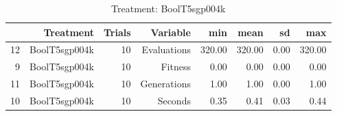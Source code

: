 \begin{table}[ht]
\centering
\begin{tabular}{rrrrrrrr}
  \hline
 & Treatment & Trials & Variable & min & mean & sd & max \\ 
  \hline
12 & BoolT5sgp004k &  10 & Evaluations & 320.00 & 320.00 & 0.00 & 320.00 \\ 
  9 & BoolT5sgp004k &  10 & Fitness & 0.00 & 0.00 & 0.00 & 0.00 \\ 
  11 & BoolT5sgp004k &  10 & Generations & 1.00 & 1.00 & 0.00 & 1.00 \\ 
  10 & BoolT5sgp004k &  10 & Seconds & 0.35 & 0.41 & 0.03 & 0.44 \\ 
   \hline
\end{tabular}
\caption{Treatment: BoolT5sgp004k} 
\end{table}
